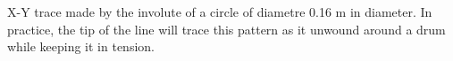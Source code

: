 \label{fig:spiral} X-Y trace made by the involute of a circle of diametre 0.16 m in diameter. In practice, the tip of the line will trace this pattern as it unwound around a drum while keeping it in tension.